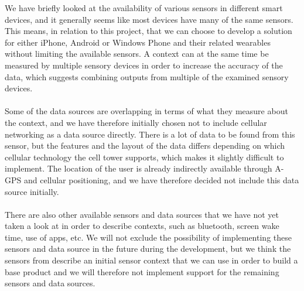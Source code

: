 We have briefly looked at the availability of various sensors in different smart devices, and it generally seems like most devices have many of the same sensors. This means, in relation to this project, that we can choose to develop a solution for either iPhone, Android or Windows Phone and their related wearables without limiting the available sensors. A context can at the same time be measured by multiple sensory devices in order to increase the accuracy of the data, which suggests combining outputs from multiple of the examined sensory devices. 
\\\\
Some of the data sources are overlapping in terms of what they measure about the context, and we have therefore initially chosen not to include cellular networking as a data source directly. There is a lot of data to be found from this sensor, but the features and the layout of the data differs depending on which cellular technology the cell tower supports, which makes it slightly difficult to implement. The location of the user is already indirectly available through A-GPS and cellular positioning, and we have therefore decided not include this data source initially. 
\\\\
There are also other available sensors and data sources that we have not yet taken a look at in order to describe contexts, such as bluetooth, screen wake time, use of apps, etc. We will not exclude the possibility of implementing these sensors and data source in the future during the development, but we think the sensors from  describe an initial sensor context that we can use in order to build a base product and we will therefore not implement support for the remaining sensors and data sources.  